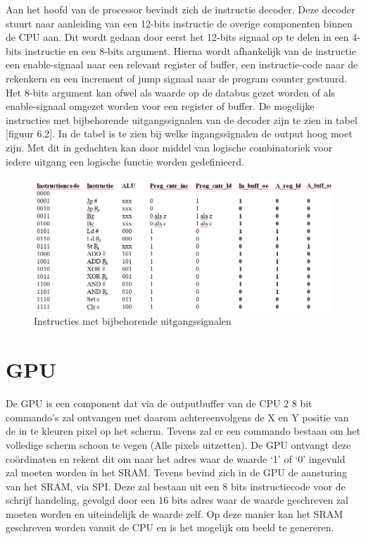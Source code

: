 \documentclass[oneside,dutch]{tudelft-report}
\begin{document}
Aan het hoofd van de processor bevindt zich de instructie decoder. Deze decoder stuurt naar aanleiding van een 12-bits instructie de overige componenten binnen de CPU aan. Dit wordt gedaan door eerst het 12-bits signaal op te delen in een 4-bits instructie en een 8-bits argument. Hierna wordt afhankelijk van de instructie een enable-signaal naar een relevant register of buffer, een instructie-code naar de rekenkern en een increment of jump signaal naar de program counter gestuurd. Het 8-bits argument kan ofwel als waarde op de databus gezet worden of als enable-signaal omgezet worden voor een register of buffer. De mogelijke instructies met bijbehorende uitgangssignalen van de decoder zijn te zien in tabel [figuur 6.2]. In de tabel is te zien bij welke ingangssignalen de output hoog moet zijn. Met dit in gedachten kan door middel van logische combinatoriek voor iedere uitgang een logische functie worden gedefinieerd.

\begin{figure}[H]
\center
\includegraphics[width=12cm]{tabel}
\caption{Instructies met bijbehorende uitgangssignalen}
\label{CPU}
\end{figure}


\chapter{GPU}
De GPU is een component dat via de outputbuffer van de CPU 2 8 bit commando’s zal ontvangen met daarom achtereenvolgens de X en Y positie van de in te kleuren pixel op het scherm. Tevens zal er een commando bestaan om het volledige scherm schoon te vegen (Alle pixels uitzetten). De GPU ontvangt deze coördinaten en rekent dit om naar het adres waar de waarde ‘1’ of ‘0’ ingevuld zal moeten worden in het SRAM. Tevens bevind zich in de GPU de aansturing van het SRAM, via SPI. Deze zal bestaan uit een 8 bits instructiecode voor de schrijf handeling, gevolgd door een 16 bits adres waar de waarde geschreven zal moeten worden en uiteindelijk de waarde zelf. Op deze manier kan het SRAM geschreven worden vanuit de CPU en is het mogelijk om beeld te genereren.
\end{document}
